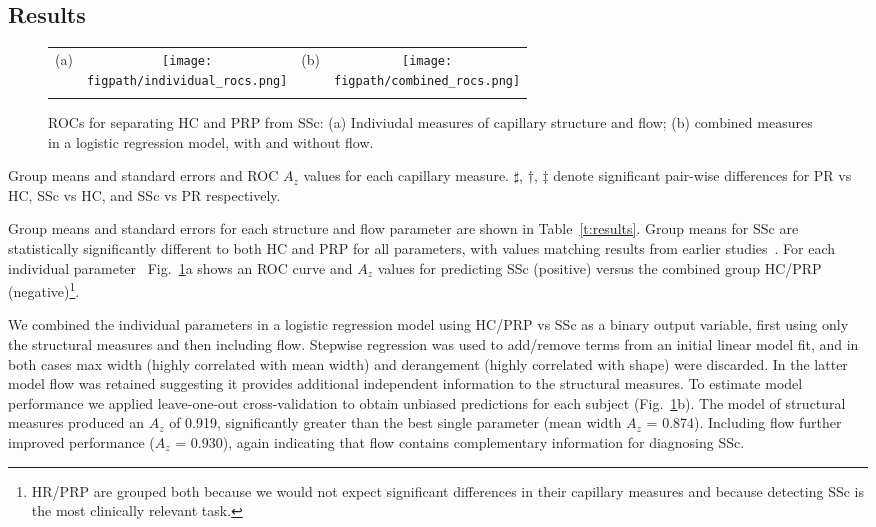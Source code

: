 \documentclass[runningheads,a4paper]{llncs}
\def\figpath{./figs}
\newcommand{\fref}[1]{Fig.~\ref{#1}}
\newcommand{\tref}[1]{Table~\ref{#1}}
\def\figpath{./figs}
\begin{document}
\subsection{Results}
\label{s:results}
%
\begin{figure}[t]
\centering
\begin{tabular}{@{}c c c c@{}}
(a) &
\texttt{[image: \\figpath/individual\_rocs.png]} &
(b) &
\texttt{[image: \\figpath/combined\_rocs.png]} \\
\noalign{\smallskip}
\end{tabular}
%
\caption{ROCs for separating HC and PRP from SSc: %
(a) Indiviudal measures of capillary structure and flow; %
(b) combined measures in a logistic regression model, with and without flow.
}
\label{f:subject_rocs}
\end{figure}
%
\begin{table}[tb]
%
\caption{Group means and standard errors and ROC $A_z$ values for each capillary measure. $\sharp$, $\dagger$, $\ddagger$ denote significant pair-wise differences for PR vs HC, SSc vs HC, and SSc vs PR respectively.}
\centering

\label{t:results}
\end{table}
%
Group means and standard errors for each structure and flow parameter are shown in \tref{t:results}. Group means for SSc are statistically significantly different to both HC and PRP for all parameters, with values matching results from earlier studies~\cite{Murray_etal_AR09,Berks_MICCAI14}. For each individual parameter ~\fref{f:subject_rocs}a shows an ROC curve and $A_z$ values for predicting SSc (positive) versus the combined group HC/PRP (negative)\footnote{HR/PRP are grouped both because we would not expect significant differences in their capillary measures and because detecting SSc is the most clinically relevant task.}. %

We combined the individual parameters in a logistic regression model using  HC/PRP vs SSc as a binary output variable, first using only the structural measures and then including flow. Stepwise regression was used to add/remove terms from an initial linear model fit, and in both cases max width (highly correlated with mean width) and derangement (highly correlated with shape) were discarded. In the latter model flow was retained suggesting it provides additional independent information to the structural measures. To estimate model performance we applied leave-one-out cross-validation to obtain unbiased predictions for each subject (\fref{f:subject_rocs}b). The model of structural measures produced an $A_z$ of 0.919, significantly greater than the best single parameter (mean width $A_z$ = 0.874). Including flow further improved performance ($A_z$ = 0.930), again indicating that flow contains complementary information for diagnosing SSc.
%
\end{document}
